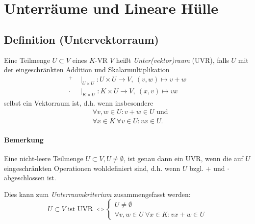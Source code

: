 \section{Unterräume und Lineare Hülle}
 \subsection{Definition (Untervektorraum)}
 	\begin{Definition}[Untervektorraum]
 		Eine Teilmenge $U\subset V$ eines $K$-VR $V$ heißt \emph{Unter(vektor)raum} (UVR), falls $U$ mit der eingeschränkten Addition und Skalarmultiplikation
 		\begin{align*}
 			^+    & \mid_{U\times U}: U\times U \to V,\ (v,w) \mapsto v+w \\
 			\cdot & \mid_{K\times U}: K\times U \to V,\ (x,v) \mapsto vx
 		\end{align*}
 		selbst ein Vektorraum ist, d.h. wenn insbesondere
 		\begin{align*}
 			  & \forall v,w \in U: v+w\in U \text{ und}  \\
 			  & \forall x\in K\ \forall v\in U: vx\in U.
 		\end{align*}
 	\end{Definition}

 	\paragraph{Bemerkung}
 		Eine nicht-leere Teilmenge $U\subset V, U\neq\emptyset$, ist genau dann ein UVR, wenn die auf $U$ eingeschränkten Operationen wohldefiniert sind, d.h. wenn $ U $ bzgl. $ + $ und $ \cdot $ abgeschlossen ist.

 		Dies kann zum \emph{Unterraumkriterium} zusammengefasst werden:
 		\begin{equation*}
 			U\subset V \text{ ist UVR }\Leftrightarrow
 			\begin{cases}
 				U\neq\emptyset                              \\
 				\forall v,w\in U\ \forall x\in K: vx+w\in U
 			\end{cases}
 		\end{equation*}

